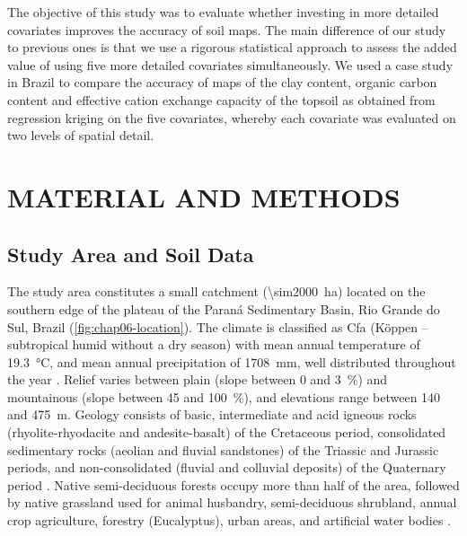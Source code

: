 The objective of this study was to evaluate whether investing in more detailed covariates improves the 
accuracy of soil maps. The main difference of our study to previous ones is that we use a rigorous statistical 
approach to assess the added value of using five more detailed covariates simultaneously. We used a  case study 
in Brazil to compare the accuracy of maps of the clay content, organic carbon content and effective cation 
exchange capacity of the topsoil as obtained from regression kriging on the five covariates, whereby each 
covariate was evaluated on two levels of spatial detail.

\section{MATERIAL AND METHODS}
\label{sec:chap06-methods}

\subsection{Study Area and Soil Data}
\label{subsec:chap06-soil-data}

The study area constitutes a small catchment (\SI{\sim2000}{\hectare}) located on the southern edge of the 
plateau of the Paraná Sedimentary Basin, Rio Grande do Sul, Brazil (\autoref{fig:chap06-location}). The 
climate is classified as Cfa (K\"oppen -- subtropical humid without a dry season) with mean annual temperature 
of \SI{19.3}{\celsius}, and mean annual precipitation of \SI{1708}{\mm}, well distributed throughout the year 
\cite{Maluf2000}. Relief varies between plain (slope between \num{0} and \SI{3}{\percent}) and mountainous 
(slope between \num{45} and \SI{100}{\percent}), and elevations range between \num{140} and \SI{475}{\m}. 
Geology consists of basic, intermediate and acid igneous rocks (rhyolite-rhyodacite and andesite-basalt) of 
the Cretaceous period, consolidated sedimentary rocks (aeolian and fluvial sandstones) of the Triassic and 
Jurassic periods, and non-consolidated (fluvial and colluvial deposits) of the Quaternary period 
\cite{GasparettoEtAl1988, MacielFilho1990, Sartori2009}. Native semi-deciduous forests occupy more than 
half of the area, followed by native grassland used for animal husbandry, semi-deciduous shrubland, annual 
crop agriculture, forestry (Eucalyptus), urban areas, and artificial water bodies \cite{SamuelRosaEtAl2011a}.

